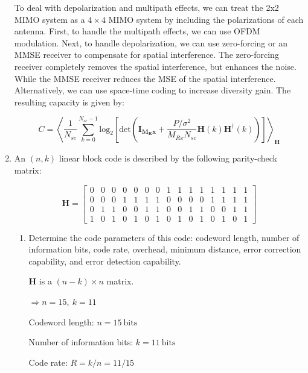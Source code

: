 \documentclass[fleqn]{article}
\makeatletter
\newenvironment{equationCenter}{\@fleqnfalse\begin{equation*}}{\end{equation*}}
\makeatother
\begin{document}
\begin{enumerate}
		To deal with depolarization and multipath effects, we can treat the 2x2 MIMO system as a $4\times 4$ MIMO system by including the polarizations of each antenna. First, to handle the multipath effects, we can use OFDM modulation. Next, to handle depolarization, we can use zero-forcing or an MMSE receiver to compensate for spatial interference. The zero-forcing receiver completely removes the spatial interference, but enhances the noise. While the MMSE receiver reduces the MSE of the spatial interference. Alternatively, we can use space-time coding to increase diversity gain. The resulting capacity is given by:
		
		\begin{equation*}
			C = \left\langle \frac{1}{N_{sc}}\sum_{k=0}^{N_{sc}-1}{\text{log}_2\left[\text{det}\left(\mathbf{I_{M_Rx}}+\frac{P/\sigma^2}{M_{Rx}N_{sc}}\mathbf{H}(k)\mathbf{H}^{\dagger}(k)\right)\right]}\right\rangle_\mathbf{H}
		\end{equation*}
		
		\item An $(n,k)$ linear block code is described by the following parity-check matrix:
		
		\begin{equationCenter}
			\mathbf{H} = \begin{bmatrix}
				0 & 0 & 0 & 0 & 0 & 0 & 0 & 1 & 1 & 1 & 1 & 1 & 1 & 1 & 1 \\
				0 & 0 & 0 & 1 & 1 & 1 & 1 & 0 & 0 & 0 & 0 & 1 & 1 & 1 & 1 \\
				0 & 1 & 1 & 0 & 0 & 1 & 1 & 0 & 0 & 1 & 1 & 0 & 0 & 1 & 1 \\
				1 & 0 & 1 & 0 & 1 & 0 & 1 & 0 & 1 & 0 & 1 & 0 & 1 & 0 & 1
			\end{bmatrix}
		\end{equationCenter}
		
		\begin{enumerate}
			\item Determine the code parameters of this code: codeword length, number of information bits, code rate, overhead, minimum distance, error correction capability, and error detection capability.
			
			$\mathbf{H}$ is a $(n-k) \times n$ matrix.

			$\Rightarrow n = 15,\ k = 11$
						
			Codeword length: $n = 15\ \text{bits}$
			
			Number of information bits: $k = 11\ \text{bits}$
			
			Code rate: $R = k/n = 11/15$
			

\end{enumerate}
\end{enumerate}
\end{document}
